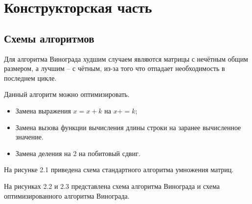 \chapter{Конструкторская часть}

\section{Схемы алгоритмов}

Для алгоритма Винограда худшим случаем являются матрицы с нечётным общим размером, а лучшим -- с чётным, из-за того что отпадает необходимость в последнем цикле.

Данный алгоритм можно оптимизировать.
\begin{itemize}
	\item Замена  выражения $x = x + k$ на $x += k$;
	\item Замена вызова функции вычисления длины строки на заранее вычисленное значение.
	\item Замена деления на 2 на побитовый сдвиг.
\end{itemize}

На рисунке 2.1 приведена схема стандартного алгоритма умножения матриц.

На рисунках 2.2 и 2.3 представлена схема алгоритма Винограда и схема оптимизированного алгоритма Винограда. 

